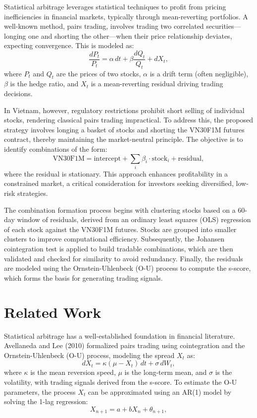 \documentclass[a4paper,12pt]{article}
\begin{document}
Statistical arbitrage leverages statistical techniques to profit from pricing inefficiencies in financial markets, typically through mean-reverting portfolios. A well-known method, pairs trading, involves trading two correlated securities—longing one and shorting the other—when their price relationship deviates, expecting convergence. This is modeled as:
\[
\frac{dP_t}{P_t} = \alpha \, dt + \beta \frac{dQ_t}{Q_t} + dX_t,
\]
where \( P_t \) and \( Q_t \) are the prices of two stocks, \( \alpha \) is a drift term (often negligible), \( \beta \) is the hedge ratio, and \( X_t \) is a mean-reverting residual driving trading decisions.

In Vietnam, however, regulatory restrictions prohibit short selling of individual stocks, rendering classical pairs trading impractical. To address this, the proposed strategy involves longing a basket of stocks and shorting the VN30F1M futures contract, thereby maintaining the market-neutral principle. The objective is to identify combinations of the form:
\[
\text{VN30F1M} = \text{intercept} + \sum_{i} \beta_i \cdot \text{stock}_i + \text{residual},
\]
where the residual is stationary. This approach enhances profitability in a constrained market, a critical consideration for investors seeking diversified, low-risk strategies.

The combination formation process begins with clustering stocks based on a 60-day window of residuals, derived from an ordinary least squares (OLS) regression of each stock against the VN30F1M futures. Stocks are grouped into smaller clusters to improve computational efficiency. Subsequently, the Johansen cointegration test is applied to build tradable combinations, which are then validated and checked for similarity to avoid redundancy. Finally, the residuals are modeled using the Ornstein-Uhlenbeck (O-U) process to compute the s-score, which forms the basis for generating trading signals.

\section{Related Work}
Statistical arbitrage has a well-established foundation in financial literature. Avellaneda and Lee (2010) formalized pairs trading using cointegration and the Ornstein-Uhlenbeck (O-U) process, modeling the spread \( X_t \) as:
\[
dX_t = \kappa (\mu - X_t) \, dt + \sigma \, dW_t,
\]
where \( \kappa \) is the mean reversion speed, \( \mu \) is the long-term mean, and \( \sigma \) is the volatility, with trading signals derived from the s-score. To estimate the O-U parameters, the process \( X_t \) can be approximated using an AR(1) model by solving the 1-lag regression:
\[
X_{n+1} = a + b X_n + \theta_{n+1},
\]
\end{document}
